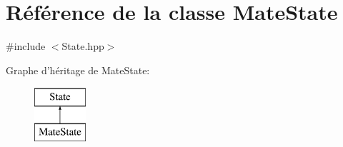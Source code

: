 \hypertarget{class_mate_state}{\section{Référence de la classe Mate\-State}
\label{class_mate_state}
}


{\ttfamily \#include $<$State.\-hpp$>$}

Graphe d'héritage de Mate\-State\-:\begin{figure}[H]
\begin{center}
\leavevmode
\includegraphics[height=2.000000cm]{class_mate_state}
\end{center}
\end{figure}
